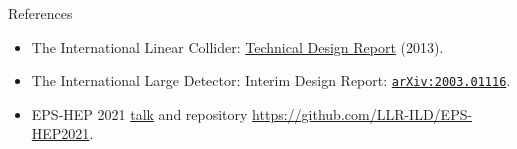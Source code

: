 \begin{block}{References}
\begin{itemize}
    \item The International Linear Collider:
        \href{https://linearcollider.org/technical-design-report/}{\color{ILD-blue} Technical Design Report} (2013).
    \item The International Large Detector: Interim Design Report:
        \href{https://arxiv.org/abs/2003.01116}{\color{ILD-blue} \texttt{arXiv:2003.01116}}.
    \item EPS-HEP 2021
        \href{https://indico.desy.de/event/28202/contributions/106023/}{\color{ILD-blue}talk}
        and repository \href{https://github.com/LLR-ILD/EPS-HEP2021}{\color{ILD-blue}https://github.com/LLR-ILD/EPS-HEP2021}.
\end{itemize}
\end{block}

